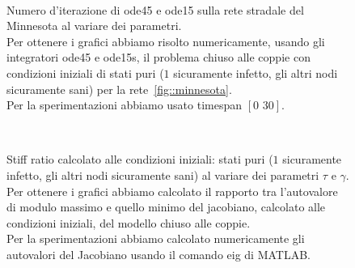 \begin{figure}[ht]
\centering
\subfloat[][$\gamma=0.10$]{}
\subfloat[][$\gamma=0.30$]{}
\\
\subfloat[][$\gamma=0.50$]{}
\subfloat[][$\gamma=0.70$]{}
\caption[Numero d'iterazione di ode45 e ode15  sulla rete stradale del Minnesota al variare dei parametri]{Numero d'iterazione di ode45 e ode15  sulla rete stradale del Minnesota al variare dei parametri.\\Per ottenere i grafici abbiamo risolto numericamente,  usando gli integratori ode45 e ode15s,  il problema chiuso alle coppie con condizioni iniziali  di stati puri ($1$ sicuramente infetto, gli altri nodi sicuramente sani) per la rete~\ref{fig::minnesota}.\\
Per la sperimentazioni abbiamo usato timespan $[0 \,\,30]$.}
\label{fig::minnesota_lenght}
\end{figure}
\begin{figure}[ht]
\centering
\subfloat[][$\gamma=0.10$]{}
\subfloat[][$\gamma=0.30$]{}
\\
\subfloat[][$\gamma=0.50$]{}
\subfloat[][$\gamma=0.70$]{}
\caption[Stiff ratio alle condizioni iniziali sulla rete stradale del Minnesota al variare dei parametri ]{Stiff ratio calcolato alle condizioni iniziali:  stati puri ($1$ sicuramente infetto, gli altri nodi sicuramente sani) al variare dei parametri $\tau$ e $\gamma$.\\ Per ottenere i grafici abbiamo calcolato il rapporto tra l'autovalore di modulo massimo e quello minimo del jacobiano, calcolato alle condizioni iniziali, del modello chiuso alle coppie.\\
Per la sperimentazioni abbiamo calcolato numericamente gli autovalori del Jacobiano usando il comando eig di MATLAB.}
\label{fig::minnesota_ratiostiff}
\end{figure}

